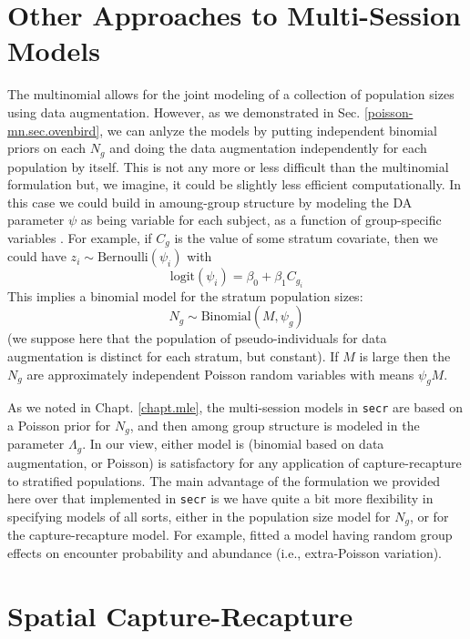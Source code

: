 \section{Other Approaches to Multi-Session Models}


The multinomial allows for the joint modeling of a collection of
population sizes using data augmentation.  However, as we demonstrated
in Sec. \ref{poisson-mn.sec.ovenbird}, we can anlyze the models by
putting independent binomial priors on each $N_{g}$ and doing the data
augmentation independently for each population by itself.  This is not
any more or less difficult than the multinomial formulation but, we
imagine, it could be slightly less efficient computationally.  In this
case we could build in amoung-group structure by modeling the DA
parameter $\psi$ as being variable for each subject, as a function of
group-specific variables \citep[see][for an
example]{hendriks_etal:2013}.  For example, if $C_{g}$ is the value of
some stratum covariate, then we could have $z_{i} \sim
\mbox{Bernoulli}( \psi_{i})$ with
\[
 \mbox{logit}(\psi_{i}) = \beta_0 + \beta_1  C_{g_{i}}
\]
This implies a binomial model for the stratum population sizes:
\[
N_{g} \sim \mbox{Binomial}(M, \psi_{g})
\]  
(we suppose here that the population of pseudo-individuals for data
augmentation is distinct for each stratum, but constant).
If $M$ is large then the $N_{g}$ are approximately
independent Poisson random variables with means $\psi_{g} M$.

As we noted in Chapt. \ref{chapt.mle}, 
the multi-session models in \mbox{\tt secr}  are based on a
Poisson prior for $N_{g}$, and then among group structure is modeled in
the parameter $\Lambda_{g}$. In our view, either model is (binomial
based on data augmentation, or Poisson) is satisfactory for any
application of capture-recapture to stratified populations.  
The main advantage of the formulation we provided here over that
implemented in \mbox{\tt secr} is we have quite a bit more flexibility
in specifying models of all sorts, either in the population size model
for $N_{g}$, or for the capture-recapture model. For example,
\citet{royle_converse:2013} fitted a model having random group effects
on encounter probability and abundance (i.e., extra-Poisson
variation). 

\section{Spatial Capture-Recapture}


